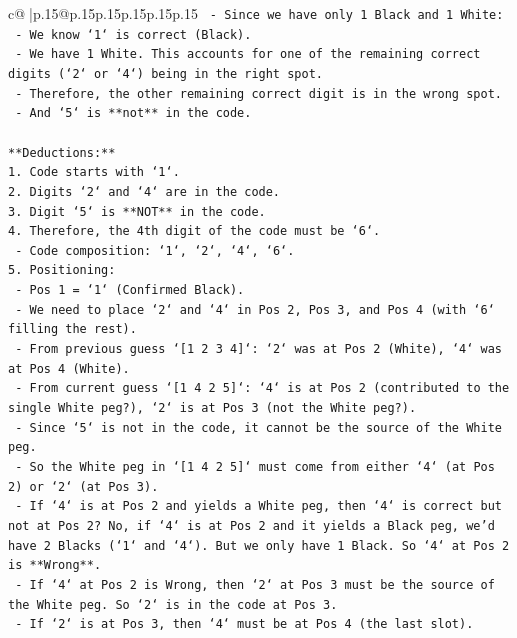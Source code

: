 \documentclass{article}
\begin{document}
{\begin{supertabular}{c@{$\;$}|p{.15\linewidth}@{}p{.15\linewidth}p{.15\linewidth}p{.15\linewidth}p{.15\linewidth}p{.15\linewidth}}
{{{\texttt{    {-} Since we have only 1 Black and 1 White:} \\
\texttt{      {-} We know `1` is correct (Black).} \\
\texttt{      {-} We have 1 White. This accounts for one of the remaining correct digits (`2` or `4`) being in the right spot.} \\
\texttt{      {-} Therefore, the other remaining correct digit is in the wrong spot.} \\
\texttt{      {-} And `5` is **not** in the code.} \\
\\ 
\texttt{**Deductions:**} \\
\texttt{1. Code starts with `1`.} \\
\texttt{2. Digits `2` and `4` are in the code.} \\
\texttt{3. Digit `5` is **NOT** in the code.} \\
\texttt{4. Therefore, the 4th digit of the code must be `6`.} \\
\texttt{   {-} Code composition: `1`, `2`, `4`, `6`.} \\
\texttt{5. Positioning:} \\
\texttt{   {-} Pos 1 = `1` (Confirmed Black).} \\
\texttt{   {-} We need to place `2` and `4` in Pos 2, Pos 3, and Pos 4 (with `6` filling the rest).} \\
\texttt{   {-} From previous guess `{[}1 2 3 4{]}`: `2` was at Pos 2 (White), `4` was at Pos 4 (White).} \\
\texttt{   {-} From current guess `{[}1 4 2 5{]}`: `4` is at Pos 2 (contributed to the single White peg?), `2` is at Pos 3 (not the White peg?).} \\
\texttt{   {-} Since `5` is not in the code, it cannot be the source of the White peg.} \\
\texttt{   {-} So the White peg in `{[}1 4 2 5{]}` must come from either `4` (at Pos 2) or `2` (at Pos 3).} \\
\texttt{   {-} If `4` is at Pos 2 and yields a White peg, then `4` is correct but not at Pos 2? No, if `4` is at Pos 2 and it yields a Black peg, we'd have 2 Blacks (`1` and `4`). But we only have 1 Black. So `4` at Pos 2 is **Wrong**.} \\
\texttt{   {-} If `4` at Pos 2 is Wrong, then `2` at Pos 3 must be the source of the White peg. So `2` is in the code at Pos 3.} \\
\texttt{   {-} If `2` is at Pos 3, then `4` must be at Pos 4 (the last slot).} \\
}}}
\end{supertabular}}
\end{document}
